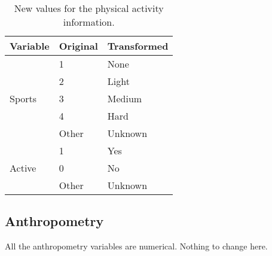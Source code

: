 \begin{table}[H]
	\centering

    \label{table:Table_PhysicalActivity_Info_Transform_Categories}
    
	\renewcommand{\arraystretch}{1.5}

    \begin{tabular}{l | l | l}
		\hline
        \rowcolor[HTML]{FF9999}		
		
        \textbf{Variable} & \textbf{Original} & \textbf{Transformed} \\ 		
        
        \hline 
                                    
            \multirow{5}{*}{Sports} & \multicolumn{1}{l}{1}     & \multicolumn{1}{l}{None}    \\\cline{2-3}
                                    & \multicolumn{1}{l}{2}     & \multicolumn{1}{l}{Light}   \\\cline{2-3}
                                    & \multicolumn{1}{l}{3}     & \multicolumn{1}{l}{Medium}  \\\cline{2-3}
									& \multicolumn{1}{l}{4}     & \multicolumn{1}{l}{Hard}    \\\cline{2-3}
                                    & \multicolumn{1}{l}{Other} & \multicolumn{1}{l}{Unknown} \\\hline
                                    
            \multirow{3}{*}{Active} & \multicolumn{1}{l}{1}     & \multicolumn{1}{l}{Yes}     \\\cline{2-3}
                                    & \multicolumn{1}{l}{0}     & \multicolumn{1}{l}{No}      \\\cline{2-3}
                                    & \multicolumn{1}{l}{Other} & \multicolumn{1}{l}{Unknown} \\\hline

        \end{tabular}

    \caption{New values for the physical activity information.}

\end{table}

\subsection{Anthropometry}

All the anthropometry variables are numerical. Nothing to change here. \vspace{3 mm}

